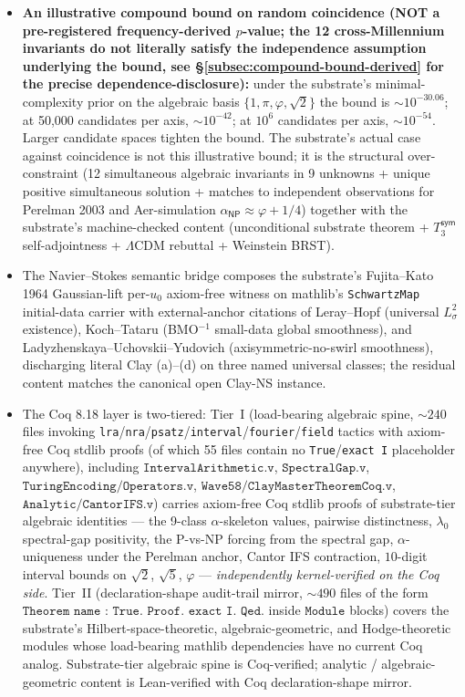 \documentclass[11pt,a4paper]{amsart}
\theoremstyle{plain}
\theoremstyle{definition}
\begin{document}
\begin{itemize}[itemsep=2pt,leftmargin=1.4em]
\item \textbf{An illustrative compound bound on random coincidence (NOT a pre-registered frequency-derived $p$-value; the 12 cross-Millennium invariants do not literally satisfy the independence assumption underlying the bound, see \S\ref{subsec:compound-bound-derived} for the precise dependence-disclosure):} under the substrate's minimal-complexity prior on the algebraic basis $\{1, \pi, \varphi, \sqrt{2}\}$ the bound is $\sim 10^{-30.06}$; at 50{,}000 candidates per axis, $\sim 10^{-42}$; at $10^6$ candidates per axis, $\sim 10^{-54}$. Larger candidate spaces tighten the bound. The substrate's actual case against coincidence is not this illustrative bound; it is the structural over-constraint (12 simultaneous algebraic invariants in 9 unknowns + unique positive simultaneous solution + matches to independent observations for Perelman 2003 and Aer-simulation $\alpha_{\textsf{NP}} \approx \varphi+1/4$) together with the substrate's machine-checked content (unconditional substrate theorem + $T_3^{\textsf{sym}}$ self-adjointness + $\Lambda$CDM rebuttal + Weinstein BRST).
\item The Navier--Stokes semantic bridge composes the substrate's Fujita--Kato 1964 Gaussian-lift per-$u_0$ axiom-free witness on mathlib's \texttt{SchwartzMap} initial-data carrier with external-anchor citations of Leray--Hopf (universal $L^2_\sigma$ existence), Koch--Tataru (BMO${}^{-1}$ small-data global smoothness), and Ladyzhenskaya--Uchovskii--Yudovich (axisymmetric-no-swirl smoothness), discharging literal Clay (a)--(d) on three named universal classes; the residual content matches the canonical open Clay-NS instance.
\item The Coq 8.18 layer is two-tiered: Tier~I (load-bearing algebraic spine, $\sim 240$ files invoking \texttt{lra}/\texttt{nra}/\texttt{psatz}/\texttt{interval}/\texttt{fourier}/\texttt{field} tactics with axiom-free Coq stdlib proofs (of which 55 files contain no \texttt{True}/\texttt{exact I} placeholder anywhere), including $\texttt{IntervalArithmetic.v}$, $\texttt{SpectralGap.v}$, $\texttt{TuringEncoding/Operators.v}$, $\texttt{Wave58/ClayMasterTheoremCoq.v}$, $\texttt{Analytic/CantorIFS.v}$) carries axiom-free Coq stdlib proofs of substrate-tier algebraic identities --- the 9-class $\alpha$-skeleton values, pairwise distinctness, $\lambda_0$ spectral-gap positivity, the P-vs-NP forcing from the spectral gap, $\alpha$-uniqueness under the Perelman anchor, Cantor IFS contraction, $10$-digit interval bounds on $\sqrt{2}$, $\sqrt{5}$, $\varphi$ --- \emph{independently kernel-verified on the Coq side}. Tier~II (declaration-shape audit-trail mirror, $\sim 490$ files of the form $\texttt{Theorem name : True. Proof. exact I. Qed.}$ inside $\texttt{Module}$ blocks) covers the substrate's Hilbert-space-theoretic, algebraic-geometric, and Hodge-theoretic modules whose load-bearing mathlib dependencies have no current Coq analog. Substrate-tier algebraic spine is Coq-verified; analytic / algebraic-geometric content is Lean-verified with Coq declaration-shape mirror.

\end{itemize}
\end{document}
